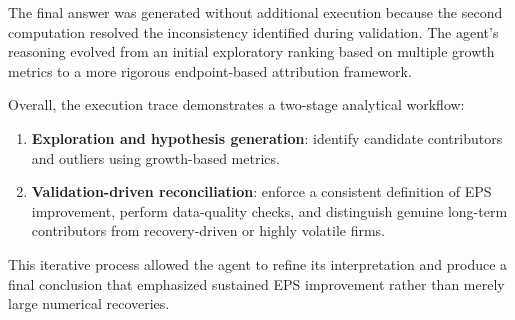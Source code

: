 
The final answer was generated without additional execution because the second computation resolved the inconsistency identified during validation. The agent's reasoning evolved from an initial exploratory ranking based on multiple growth metrics to a more rigorous endpoint-based attribution framework.

Overall, the execution trace demonstrates a two-stage analytical workflow:

\begin{enumerate}
  \item \textbf{Exploration and hypothesis generation}: identify candidate contributors and outliers using growth-based metrics.
  \item \textbf{Validation-driven reconciliation}: enforce a consistent definition of EPS improvement, perform data-quality checks, and distinguish genuine long-term contributors from recovery-driven or highly volatile firms.
\end{enumerate}

This iterative process allowed the agent to refine its interpretation and produce a final conclusion that emphasized sustained EPS improvement rather than merely large numerical recoveries.
